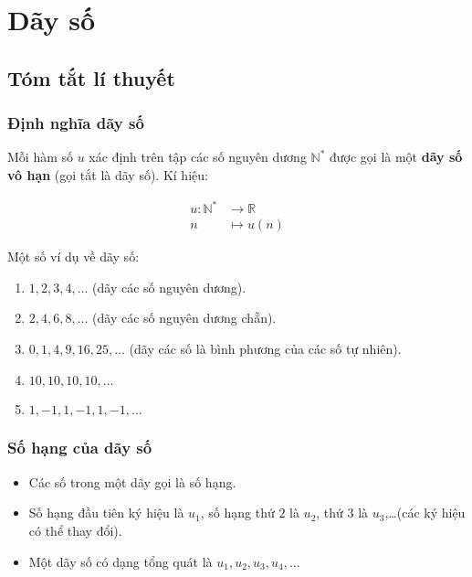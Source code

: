 \section{Dãy số}
\subsection{Tóm tắt lí thuyết}
\subsubsection{Định nghĩa dãy số}
\begin{dn}
Mỗi hàm số $u$ xác định trên tập các số nguyên dương $\mathbb{N}^*$ được gọi là một \textbf{dãy số vô hạn} (gọi tắt là dãy số). Kí hiệu:
\begin{center}
	\begin{align*}
	u: \mathbb{N}^*&\longrightarrow \mathbb{R}\\
	n&\longmapsto u(n)
	\end{align*}

\end{center}
\end{dn}
\begin{vd}%
Một số ví dụ về dãy số:
\begin{enumerate}
\item $1,2,3,4,\ldots$ (dãy các số nguyên dương).
\item $2,4,6,8,\ldots$ (dãy các số nguyên dương chẵn).
\item $0,1,4,9,16,25,\ldots$ (dãy các số là bình phương của các số tự nhiên).
\item $10,10,10,10,\ldots$
\item $1,-1,1,-1,1,-1,\ldots$
\end{enumerate}
\end{vd}
\subsubsection{Số hạng của dãy số}
\begin{itemize}
\item Các số trong một dãy gọi là số hạng.
\item Số hạng đầu tiên ký hiệu là $u_1$, số hạng thứ $2$ là $u_2$, thứ $3$ là $u_3$,\ldots (các ký hiệu có thể thay đổi).
\item Một dãy số có dạng tổng quát là $u_1,u_2,u_3,u_4,\ldots$
\end{itemize}
